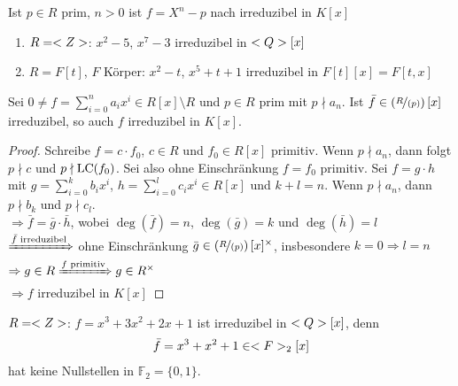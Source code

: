 \begin{example}
	Ist $p \in R$ prim, $n > 0$ ist $f = X^n-p$ nach  irreduzibel in $K[x]$
	\begin{enumerate}[label=(\alph*)]
		\item $R = \whole$: $x^2 -5$, $x^7 - 3$ irreduzibel in $\ratio[x]$
		\item $R = F[t]$, $F$ Körper: $x^2-t$, $x^5 + t +1$ irreduzibel in $F[t][x] = F[t,x]$
	\end{enumerate}
\end{example}

\begin{proposition}[Reduktionskriterium]
	Sei $0 \neq f = \sum_{i=0}^{n} a_i x^i \in R[x]\setminus R$ und $p \in R$ prim mit $p \nmid a_n$. Ist $\bar{f} \in \left(\lnkset{R}{(p)} \right)[x]$ irreduzibel, so auch $f$ irreduzibel in $K[x]$.
\end{proposition}
\begin{proof}
	Schreibe $f=c\cdot f_0$, $c\in R$ und $f_0\in R[x]$ primitiv. Wenn $p\nmid a_n$, dann folgt $p\nmid c$ und $p\nmid \LC(f_0)$. Sei also ohne Einschränkung $f=f_0$ primitiv. Sei $f=g\cdot h$ mit $g=\sum_{i =0}^k b_ix^i$, $h=\sum_{i =0}^l c_ix^i\in R[x]$ und $k+l=n$. Wenn $p\nmid a_n$, dann $p\nmid b_k$ und $p\nmid c_l$. \\
	$\Rightarrow\bar{f} = \bar{g}\cdot\bar{h}$, wobei $\deg(\bar{f})=n$, $\deg(\bar{g})=k$ und $\deg(\bar{h})=l$ \\
	$\xRightarrow{\bar{f}\text{ irreduzibel}}$ ohne Einschränkung $\bar{g}\in\left(\lnkset{R}{(p)}\right)[x]^\times$, insbesondere $k=0\Rightarrow l=n$ \\
	$\Rightarrow g\in R\xRightarrow{f\text{ primitiv}} g\in R^\times$ \\
	$\Rightarrow f$ irreduzibel in $K[x]$
\end{proof}

\begin{example}
	$R=\whole$: $f=x^3+3x^2+2x+1$ ist irreduzibel in $\ratio[x]$, denn
	\begin{align}
		\bar{f} = x^3+x^2+1\in \mathbb{F}_2[x]\notag
	\end{align}
	hat keine Nullstellen in $\mathbb{F}_2=\{0,1\}$.
\end{example}

